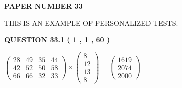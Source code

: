 \documentclass[12pt]{article}
\begin{document}
   
\newpage 
\setcounter{page}{ 
    33001 } 
   
   
   
   
 {\textbf{ \Large{ PAPER NUMBER           33  }}}
   
   
\vspace{0.2in}
   
   
   
   
   
   
 \vspace{0.2in}
{\Huge  THIS IS AN EXAMPLE OF}
{\Huge  PERSONALIZED TESTS. }
   
   
  
\vspace{0.2in}
  
{\textbf{\Large{QUESTION
33.1 
 (           1 ,           1 ,          60 )
}}}
  
  
 
 
\noindent{}

 
$\left( \begin{array}{ccccccccccccccc}
          28  & 
          49  & 
          35  & 
          44  \\ 
          42  & 
          52  & 
          50  & 
          58  \\ 
          66  & 
          66  & 
          32  & 
          33
\end{array}\right) \times
\left( \begin{array}{c}
           8  \\ 
          12  \\ 
          13  \\ 
           8
\end{array}\right)  =
\left( \begin{array}{c}
        1619  \\ 
        2074  \\ 
        2000
\end{array}\right)  $
 
\end{document}
